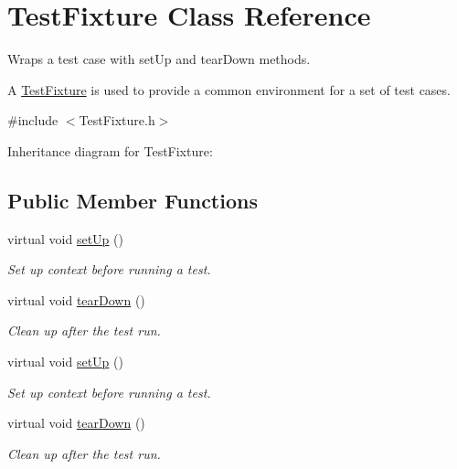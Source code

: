 \hypertarget{class_test_fixture}{\section{Test\+Fixture Class Reference}
\label{class_test_fixture}
}


Wraps a test case with set\+Up and tear\+Down methods.

A \hyperlink{class_test_fixture}{Test\+Fixture} is used to provide a common environment for a set of test cases.  




{\ttfamily \#include $<$Test\+Fixture.\+h$>$}



Inheritance diagram for Test\+Fixture\+:
\subsection*{Public Member Functions}
\begin{DoxyCompactItemize}
\item 
\hypertarget{class_test_fixture_a0e77590b14a3ec7f93fe02e5b89a242f}{virtual void \hyperlink{class_test_fixture_a0e77590b14a3ec7f93fe02e5b89a242f}{set\+Up} ()}\label{class_test_fixture_a0e77590b14a3ec7f93fe02e5b89a242f}

\begin{DoxyCompactList}\small\item\em Set up context before running a test. \end{DoxyCompactList}\item 
\hypertarget{class_test_fixture_a707dd4d7d0910af916343d79c0feffc9}{virtual void \hyperlink{class_test_fixture_a707dd4d7d0910af916343d79c0feffc9}{tear\+Down} ()}\label{class_test_fixture_a707dd4d7d0910af916343d79c0feffc9}

\begin{DoxyCompactList}\small\item\em Clean up after the test run. \end{DoxyCompactList}\item 
\hypertarget{class_test_fixture_a0e77590b14a3ec7f93fe02e5b89a242f}{virtual void \hyperlink{class_test_fixture_a0e77590b14a3ec7f93fe02e5b89a242f}{set\+Up} ()}\label{class_test_fixture_a0e77590b14a3ec7f93fe02e5b89a242f}

\begin{DoxyCompactList}\small\item\em Set up context before running a test. \end{DoxyCompactList}\item 
\hypertarget{class_test_fixture_a707dd4d7d0910af916343d79c0feffc9}{virtual void \hyperlink{class_test_fixture_a707dd4d7d0910af916343d79c0feffc9}{tear\+Down} ()}\label{class_test_fixture_a707dd4d7d0910af916343d79c0feffc9}

\begin{DoxyCompactList}\small\item\em Clean up after the test run. \end{DoxyCompactList}\end{DoxyCompactItemize}


